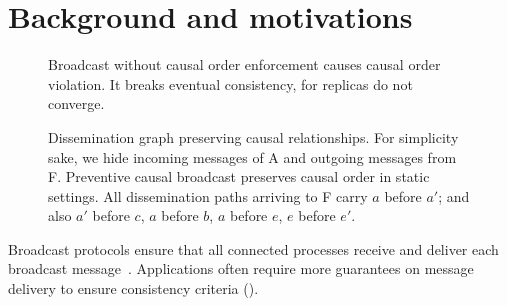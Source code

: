 
\section{Background and motivations}
\label{sec:motivations}

\begin{figure}
  \begin{center}
  
  \caption{\label{fig:generalproblem}Broadcast without causal order enforcement
    causes causal order violation. It breaks eventual consistency, for replicas
    do not converge.}
  \end{center}
\end{figure}


\begin{figure*}
  \begin{center}
    
    \caption{\label{fig:disseminationtree}Dissemination graph preserving causal
      relationships. For simplicity sake, we hide incoming messages of A and
      outgoing messages from F. Preventive causal broadcast preserves causal
      order in static settings. All dissemination paths arriving to F carry $a$
      before $a'$; and also $a'$ before $c$, $a$ before $b$, $a$ before $e$, $e$
      before $e'$.}
  \end{center}
\end{figure*}



Broadcast protocols ensure that all connected processes receive and deliver each
broadcast message~\cite{hadzilacos1994modular}. Applications often require more
guarantees on message delivery to ensure consistency criteria (\REF).



